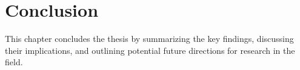 \chapter{Conclusion}
\label{chapter5}

\begin{paragraph}
This chapter concludes the thesis by summarizing the key findings, discussing their implications, and outlining potential future directions for research in the field.
\end{paragraph}
